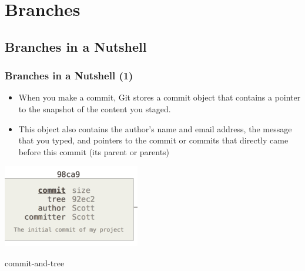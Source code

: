 \section{Branches}

\subsection{Branches in a Nutshell}

\begin{frame}
  \frametitle{Branches in a Nutshell (1)}
  \begin{itemize}
  \item When you make a commit, Git stores a commit object that contains a pointer to the snapshot of the content you staged.
  \item This object also contains the author’s name and email address, the message that you typed, and pointers to the commit or commits that directly came before this commit (its parent or parents)
  \end{itemize}
  \begin{center}
    \includegraphics[width=0.7\linewidth]{figures/git-commit}
  \end{center}
commit-and-tree
\end{frame}



